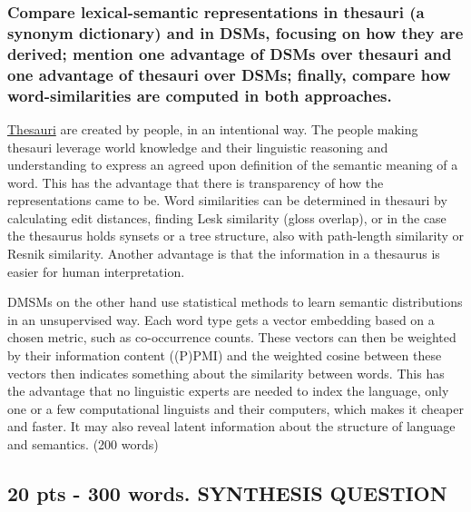 \documentclass[
  11pt,
  british,
]{article}
\begin{document}
\hypertarget{compare-lexical-semantic-representations-in-thesauri-a-synonym-dictionary-and-in-dsms-focusing-on-how-they-are-derived-mention-one-advantage-of-dsms-over-thesauri-and-one-advantage-of-thesauri-over-dsms-finally-compare-how-word-similarities-are-computed-in-both-approaches.}{%
\subsubsection{Compare lexical-semantic representations in thesauri (a
synonym dictionary) and in DSMs, focusing on how they are derived;
mention one advantage of DSMs over thesauri and one advantage of
thesauri over DSMs; finally, compare how word-similarities are computed
in both
approaches.}\label{compare-lexical-semantic-representations-in-thesauri-a-synonym-dictionary-and-in-dsms-focusing-on-how-they-are-derived-mention-one-advantage-of-dsms-over-thesauri-and-one-advantage-of-thesauri-over-dsms-finally-compare-how-word-similarities-are-computed-in-both-approaches.}}

\href{../Data/Thesaurus.md}{Thesauri} are created by people, in an
intentional way. The people making thesauri leverage world knowledge and
their linguistic reasoning and understanding to express an agreed upon
definition of the semantic meaning of a word. This has the advantage
that there is transparency of how the representations came to be. Word
similarities can be determined in thesauri by calculating edit
distances, finding Lesk similarity (gloss overlap), or in the case the
thesaurus holds synsets or a tree structure, also with path-length
similarity or Resnik similarity. Another advantage is that the
information in a thesaurus is easier for human interpretation.

DMSMs on the other hand use statistical methods to learn semantic
distributions in an unsupervised way. Each word type gets a vector
embedding based on a chosen metric, such as co-occurrence counts. These
vectors can then be weighted by their information content ((P)PMI) and
the weighted cosine between these vectors then indicates something about
the similarity between words. This has the advantage that no linguistic
experts are needed to index the language, only one or a few
computational linguists and their computers, which makes it cheaper and
faster. It may also reveal latent information about the structure of
language and semantics. (200 words)

\hypertarget{pts---300-words.-synthesis-question}{%
\subsection{20 pts - 300 words. SYNTHESIS
QUESTION}\label{pts---300-words.-synthesis-question}}
\end{document}

